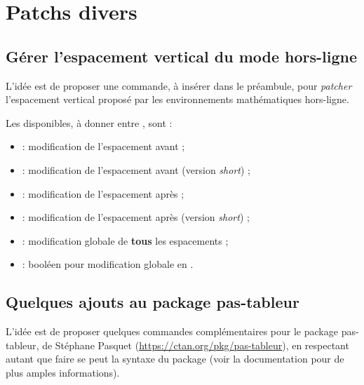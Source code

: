 \documentclass[french,11pt,a4paper]{article}
\begin{document}
\pagebreak

\section{Patchs divers}

\subsection{Gérer l'espacement vertical du mode hors-ligne}

L'idée est de proposer une commande, à insérer dans le préambule, pour \textit{patcher} l'espacement vertical proposé par les environnements mathématiques hors-ligne.


Les  disponibles, à donner entre \MontreCode{[...]}, sont :

\begin{itemize}
	\item {} : modification de l'espacement avant ;
	\item {} : modification de l'espacement avant (version \textit{short}) ;
	\item {} : modification de l'espacement après ;
	\item {} : modification de l'espacement après (version \textit{short}) ;
	\item {} : modification globale de \textbf{tous} les espacements ;
	\item {} : booléen pour modification globale en .
\end{itemize}

\subsection{Quelques ajouts au package pas-tableur}

L'idée est de proposer quelques commandes complémentaires pour le package \textsf{pas-tableur}, de Stéphane Pasquet (\url{https://ctan.org/pkg/pas-tableur}), en respectant autant que faire se peut la syntaxe du package (voir la documentation pour de plus amples informations).
\end{document}
